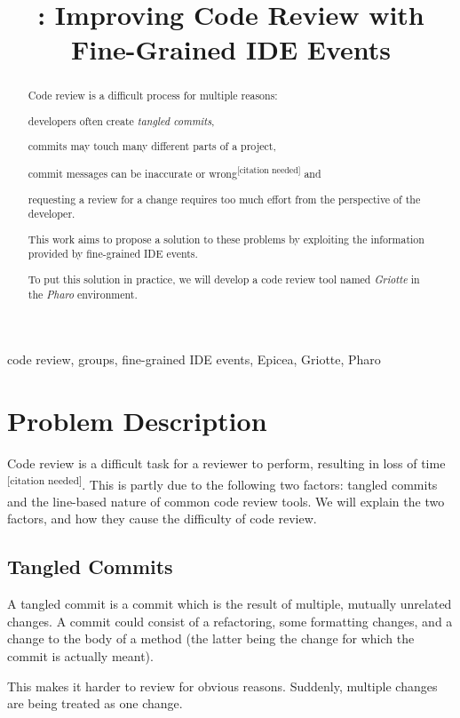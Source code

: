 \documentclass[conference,a4paper]{IEEEtran}
\title{\Gr{}: Improving Code Review with Fine-Grained IDE Events}
\author{\IEEEauthorblockN{Skip~Lentz}\IEEEauthorblockA{EEMCS\\Delft
    University of Technology} \and
  \IEEEauthorblockN{Mart\'{i}n~Dias}\IEEEauthorblockA{RMoD\\INRIA
    Lille-Nord Europe}}
\newcommand{\citeneeded}{\textsuperscript{{[}citation needed{]}}}
\newcommand{\TC}{tangled commit}
\newcommand{\Ep}{Epicea}
\newcommand{\Gr}{Griotte}
\begin{document}
\maketitle{}
\begin{abstract}
  Code review is a difficult process for multiple reasons:
  \begin{enumerate*}
  \item developers often create \textit{tangled commits},
  \item commits may touch many different parts of a project,
  \item commit messages can be inaccurate or wrong\citeneeded{} and
  \item requesting a review for a change requires too much effort from
    the perspective of the developer.
  \end{enumerate*}

  This work aims to propose a solution to these problems by exploiting
  the information provided by fine-grained IDE events.

  To put this solution in practice, we will develop a code review tool
  named \textit{\Gr} in the \textit{Pharo} environment.
\end{abstract}
\begin{IEEEkeywords}
  code review, groups, fine-grained IDE events, \Ep, \Gr, Pharo
\end{IEEEkeywords}

\section{Problem Description}
\label{sec:problem-description}
Code review is a difficult task for a reviewer to perform, resulting
in loss of time \citeneeded{}. This is partly due to the following two
factors: \TC{}s and the line-based nature of common code review
tools. We will explain the two factors, and how they cause the
difficulty of code review.

\subsection{Tangled Commits}
\label{sec:tangled-commits}
A \TC{} is a commit which is the result of multiple, mutually
unrelated changes. A commit could consist of a refactoring, some
formatting changes, and a change to the body of a method (the latter
being the change for which the commit is actually meant).

This makes it harder to review for obvious reasons. Suddenly, multiple
changes are being treated as one change.
\end{document}
